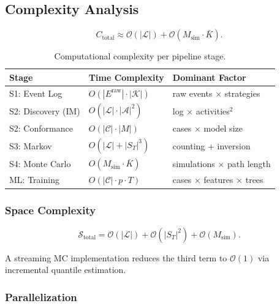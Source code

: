 \subsection{Complexity Analysis}
\label{sec:prop-complexity}

\begin{equation}
\label{eq:total-cost}
C_{\text{total}} \approx \mathcal{O}(|\mathcal{L}|)
    + \mathcal{O}(M_{\text{sim}} \cdot \bar{K}).
\end{equation}

\begin{table}[htbp]
\centering
\caption{Computational complexity per pipeline stage.}
\label{tab:complexity}
\begin{tabular}{lll}
\toprule
\textbf{Stage} & \textbf{Time Complexity} & \textbf{Dominant Factor} \\
\midrule
S1: Event Log         & $O(|E^{\text{raw}}| \cdot |\mathcal{K}|)$ & raw events $\times$ strategies \\
S2: Discovery (IM)    & $O(|\mathcal{L}| \cdot |\mathcal{A}|^2)$  & log $\times$ activities$^2$ \\
S2: Conformance       & $O(|\mathcal{C}| \cdot |M|)$              & cases $\times$ model size \\
S3: Markov            & $O(|\mathcal{L}| + |S_T|^3)$              & counting + inversion \\
S4: Monte Carlo       & $O(M_{\text{sim}} \cdot \bar{K})$         & simulations $\times$ path length \\
ML: Training          & $O(|\mathcal{C}| \cdot p \cdot T)$        & cases $\times$ features $\times$ trees \\
\bottomrule
\end{tabular}
\end{table}

\subsubsection{Space Complexity}

\begin{equation}
\label{eq:space-complexity}
\mathcal{S}_{\text{total}} = \mathcal{O}(|\mathcal{L}|)
    + \mathcal{O}(|S_T|^2) + \mathcal{O}(M_{\text{sim}}).
\end{equation}

A streaming MC implementation reduces the third term to
$\mathcal{O}(1)$ via incremental quantile estimation.

\subsubsection{Parallelization}

